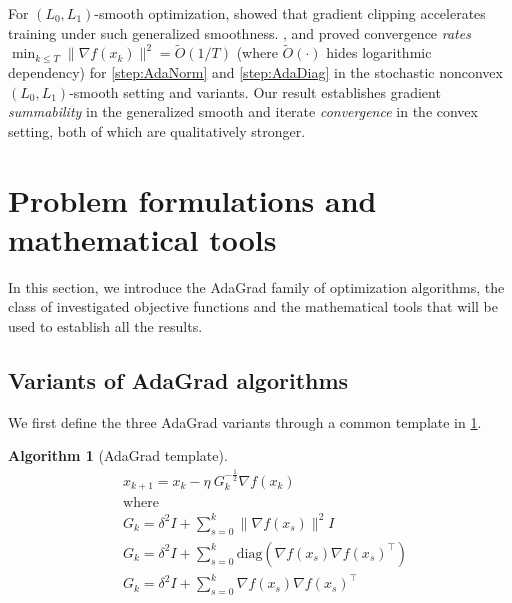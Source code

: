 \documentclass{article}
\theoremstyle{plain}
\theoremstyle{definition}
\newtheorem{algorithm_def}[theorem]{Algorithm}
\theoremstyle{remark}
\newcommand{\norm}[1]{\| #1 \|}
\begin{document}
For $(L_0,L_1)$-smooth optimization,
\citet{ZhangKJ2020} showed that
gradient clipping accelerates training under such generalized
smoothness.
\citet{faw2023beyond}, \citet{bohan2023ada} and \citet{liu2025adagrad}
proved convergence \emph{rates}
$\min_{k\leq T}\norm{\nabla f(x_k)}^2 = \tilde{O}(1/T)$ (where $\tilde{O}(\cdot)$ hides logarithmic dependency) for \ref{step:AdaNorm} and \ref{step:AdaDiag}
in the stochastic nonconvex $(L_0,L_1)$-smooth setting and variants.
Our result establishes gradient \emph{summability} in the generalized smooth
and iterate \emph{convergence} in the convex setting, both of which are
qualitatively stronger.

\section{Problem formulations and mathematical tools}\label{sec:framework}

In this section, we introduce the AdaGrad family of optimization algorithms, the class of investigated objective functions and the mathematical tools that will be used to establish all the results.

\subsection{Variants of AdaGrad algorithms}
We first define the three AdaGrad variants through a common template in \cref{alg:adagradtemplate}.

\begin{algorithm_def}[AdaGrad template]\label{alg:adagradtemplate}
\begin{align}
& x_{k+1} = x_{k} - \eta\ G_k^{-\frac12} \nabla f(x_k) \tag{AdaGrad-Step}\label{step:AdaGrad-Step} \\
 & \text{where}  \nonumber \\
& G_k = \delta^2 I + \sum_{s=0}^k \norm{\nabla f(x_s)}^2  I \tag{AdaNorm} \label{step:AdaNorm} \\
& G_k = \delta^2 I + \sum_{s=0}^k \mathrm{diag}(\nabla f(x_s) \nabla f(x_s)^\top) \tag{AdaDiag} \label{step:AdaDiag} \\
& G_k =\delta^2 I + \sum_{s=0}^k \nabla f(x_s) \nabla f(x_s)^\top \tag{AdaFull} \label{step:AdaFull}
\end{align}
\end{algorithm_def}
\end{document}
